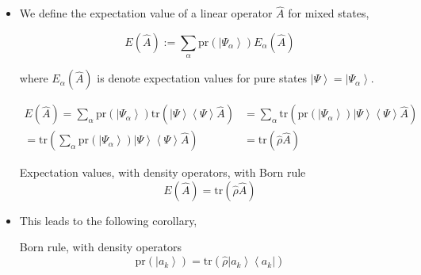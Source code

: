 \documentclass[9pt,handout]{beamer}
\newcommand{\pr}[0]{\text{pr}}
\newcommand{\tr}[0]{\text{tr}}
\begin{document}
\begin{frame}{}
\begin{itemize}
\item We define the expectation value of a linear operator $\widehat{A}$ for mixed states, 

$$E \left( \widehat{A} \right) := \sum_{\alpha} \pr \left( \left\lvert \Psi_\alpha \right\rangle \right) E_\alpha \left( \widehat{A} \right)$$

where $E_\alpha \left( \widehat{A} \right)$ is denote expectation values for pure states $\left\lvert \Psi \right\rangle = \left\lvert \Psi_\alpha \right\rangle$.

\begin{align*}
E \left( \widehat{A} \right) = \sum_{\alpha} \pr \left( \left\lvert \Psi_\alpha \right\rangle \right) \tr \left( \left\lvert \Psi \right\rangle \left\langle \Psi \right\rangle \widehat{A} \right) & = \sum_{\alpha} \tr \left( \pr \left( \left\lvert \Psi_\alpha \right\rangle \right) \left\lvert \Psi \right\rangle \left\langle \Psi \right\rangle \widehat{A} \right) \\
= \tr \left( \sum_{\alpha} \pr \left( \left\lvert \Psi_\alpha \right\rangle \right) \left\lvert \Psi \right\rangle \left\langle \Psi \right\rangle \widehat{A} \right) & = \tr \left( \widehat{\rho} \widehat{A} \right)
\end{align*}

\begin{block}{Expectation values, with density operators, with Born rule}
$$E \left( \widehat{A} \right) = \tr \left( \widehat{\rho} \widehat{A} \right)$$
\end{block}

\item This leads to the following corollary,

\begin{block}{Born rule, with density operators}
$$\pr \left( \left\lvert a_k \right\rangle \right) = \tr \left( \widehat{\rho} \left\lvert a_k \right\rangle \left\langle a_k \right\rvert \right)$$
\end{block}
\end{itemize}
\end{frame}
\end{document}
